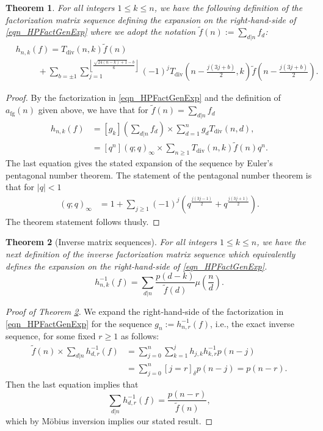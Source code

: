 \documentclass[12pt,reqno,a4letter]{article}
\numberwithin{figure}{section}
\numberwithin{table}{section}
\numberwithin{equation}{section}
\newcommand{\Iverson}[1]{\ensuremath{\left[#1\right]_{\delta}}}
\DeclareMathOperator{\fg}{fg}
\DeclareMathOperator{\Div}{div}
\theoremstyle{plain}
\newtheorem{theorem}{Theorem}
\numberwithin{theorem}{section}
\theoremstyle{definition}
\begin{document}
\begin{theorem} 
For all integers $1 \leq k \leq n$, we have the following definition of the factorization matrix 
sequence defining the expansion on the right-hand-side of \eqref{eqn_HPFactGenExp} where 
we adopt the notation $\widetilde{f}(n) := \sum_{d|n} f_d$: 
\begin{align*} 
 & h_{n,k}(f) = T_{\Div}(n, k) \widetilde{f}(n) \\ 
 & \phantom{=\quad\ } + \sum_{b=\pm 1} 
     \sum_{j=1}^{\left\lfloor \frac{\sqrt{24(n-k)+1}-b}{6} \right\rfloor} 
     (-1)^j T_{\Div}\left(n-\frac{j(3j+b)}{2}, k\right) 
     \widetilde{f}\left(n-\frac{j(3j+b)}{2}\right).
\end{align*} 
\end{theorem} 
\begin{proof} 
By the factorization in \eqref{eqn_HPFactGenExp} and the definition of $a_{\fg}(n)$ given above, we have 
that for $\widetilde{f}(n) = \sum_{d|n} f_d$ 
\begin{align*} 
h_{n,k}(f) & = [g_k] \left(\sum_{d|n} f_d\right) \times \sum_{d=1}^n g_d T_{\Div}(n, d), \\ 
     & = 
     [q^n] (q; q)_{\infty} \times \sum_{n \geq 1} T_{\Div}(n, k) \widetilde{f}(n) q^n. 
\end{align*} 
The last equation gives the stated expansion of the sequence by 
Euler's pentagonal number theorem. The statement of the pentagonal number theorem 
is that for $|q| < 1$
\begin{align*} 
(q; q)_{\infty} & = 1 + \sum_{j \geq 1} (-1)^j \left(q^{\frac{j(3j-1)}{2}} + 
     q^{\frac{j(3j+1)}{2}}\right). 
\end{align*} 
The theorem statement follows thusly.
\end{proof} 

\begin{theorem}[Inverse matrix sequences] 
\label{theorem_HP_InvSeqs} 
For all integers $1 \leq k \leq n$, we have the next definition of the inverse factorization matrix 
sequence which equivalently defines the expansion on the right-hand-side of \eqref{eqn_HPFactGenExp}. 
\[
h_{n,k}^{-1}(f) = \sum_{d|n} \frac{p(d-k)}{\widetilde{f}(d)} \mu\left(\frac{n}{d}\right). 
\] 
\end{theorem} 
\begin{proof}[Proof of Theorem \ref{theorem_HP_InvSeqs}] 
We expand the right-hand-side of the factorization in \eqref{eqn_HPFactGenExp} 
for the sequence $g_n := h_{n,r}^{-1}(f)$, i.e., the exact inverse sequence, 
for some fixed $r \geq 1$ as follows: 
\begin{align*} 
\widetilde{f}(n) \times \sum_{d|n} h_{d,r}^{-1}(f) & = 
     \sum_{j=0}^n \sum_{k=1}^j h_{j,k} h_{k,r}^{-1} p(n-j) \\ 
     & = 
     \sum_{j=0}^n \Iverson{j = r} p(n-j) = p(n-r). 
\end{align*} 
Then the last equation implies that 
$$\sum_{d|n} h_{d,r}^{-1}(f) = \frac{p(n-r)}{\widetilde{f}(n)}, $$ 
which by M\"obius inversion implies our stated result. 
\end{proof}
\end{document}
